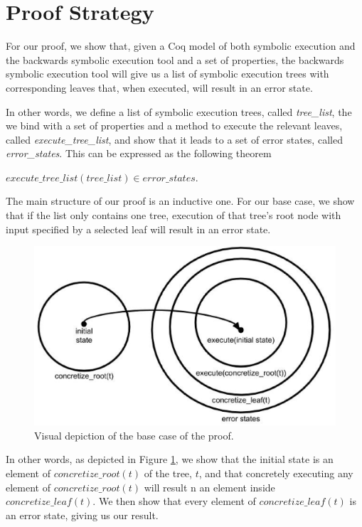 \section{Proof Strategy}
For our proof, we show that, given a Coq model of both symbolic execution and the backwards symbolic execution tool and a set of properties, 
the backwards symbolic execution tool will give us a list of symbolic execution trees with corresponding leaves that, when executed, will result in an error state.

In other words, we define a list of symbolic execution trees, called \textit{tree\_list}, the we bind with a set of properties and a method to execute the relevant leaves, called \textit{execute\_tree\_list},
and show that it leads to a set of error states, called \textit{error\_states}. This can be expressed as the following theorem


\begin{theorem}
\label{thm:sufficiency}
$execute\_tree\_list (tree\_list) \in error\_states$.
\end{theorem}

The main structure of our proof is an inductive one. 
For our base case, we show that if the list only contains one tree, execution of that tree's root node with input specified by a selected leaf will result in an error state.

\begin{figure}
\label{fig:basecase}
\includegraphics[width=\textwidth]{set3.eps}
\caption{Visual depiction of the base case of the proof.}
\end{figure}

In other words, as depicted in Figure \ref{fig:basecase}, we show that the initial state is an element of $concretize\_root(t)$ of the tree, $t$, and that concretely executing any element of $concretize\_root(t)$ will result n an element inside $concretize\_leaf(t).$
We then show that every element of $concretize\_leaf(t)$ is an error state, giving us our result.



